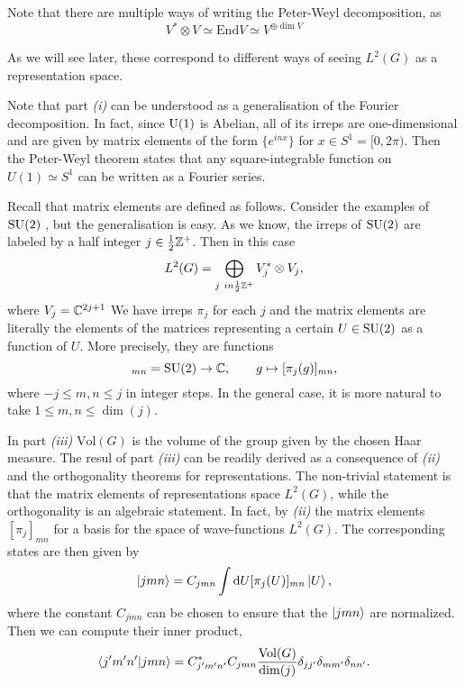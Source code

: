 Note that there are multiple ways of writing the Peter-Weyl decomposition, as
\begin{equation}
    V^{\ast} \otimes V \simeq \mathrm{End}V \simeq V^{\oplus \dim V}
\end{equation}

As we will see later, these correspond to different ways of seeing $L^2(G)$ as a representation space.

Note that part \emph{(i)} can be understood as a generalisation of the Fourier decomposition.
In fact, since $\mathrm{U}(1)$ is Abelian, all of its irreps are one-dimensional and are given by matrix elements of the form $\{e^{i n x}\}$ for $x \in S^{1} = [0, 2 \pi)$.
Then the Peter-Weyl theorem states that any square-integrable function on $U(1) \simeq S^1$ can be written as a Fourier series.

Recall that matrix elements are defined as follows.
Consider the examples of $\text{SU}(2) $ \cite{milstead2018qyangmills}, but the generalisation is easy.
As we know, the irreps of $\text{SU}(2) $ are labeled by a half integer $j \in \frac{1}{2} \mathbb{Z}^+$.
Then in this case
\begin{equation}
    L^2 (G) = \bigoplus_{j \ in \frac{1}{2} \mathbb{Z}^+} V_j^{\ast} \otimes V_j,
\end{equation}
where $V_j = \mathbb{C}^{2j + 1}$
We have irreps $\pi_j$ for each $j$ and the matrix elements are literally the elements of the matrices representing a certain $U \in \text{SU}(2)$ as a function of $U$.
More precisely, they are functions
\begin{equation}
    [\pi_j( \cdot )]_{mn} = \SU(2) \to \C, \qquad
    g \mapsto [\pi_j(g)]_{mn},
\end{equation}
where $-j \leq m,n \leq j$ in integer steps.
In the general case, it is more natural to take $1 \leq m,n \leq \dim(j) $.

In part \emph{(iii)} $\mathrm{Vol}(G) $ is the volume of the group given by the chosen Haar measure.
The resul of part \emph{(iii)} can be readily derived as a consequence of \emph{(ii)} and the orthogonality theorems for representations.
The non-trivial statement is that the matrix elements of representations space $L^2(G)$, while the orthogonality is an algebraic statement.
In fact, by \emph{(ii)} the matrix elements $[\pi_j]_{mn}$ for a basis for the space of wave-functions $L^2(G)$.
The corresponding states are then given by
\begin{equation}
    \ket{jmn} = C_{jmn} \int \dd U [\pi_j(U)]_{mn} \ket{U},
\end{equation}
where the constant $C_{jmn}$ can be chosen to ensure that the $\ket{jmn}$ are normalized.
Then we can compute their inner product,
\begin{equation*}
    \braket{j^{\prime} m^{\prime} n^{\prime}}{jmn} =
    C_{j^{\prime} m^{\prime} n^{\prime}}^{\ast} C_{jmn}
    \frac{\mathrm{Vol}(G)}{\dim(j)}
    \delta_{j j^{\prime}} \delta_{m m^{\prime}} \delta_{n n^{\prime}}.
\end{equation*}

